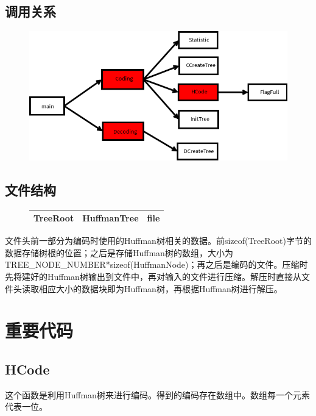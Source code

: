 \documentclass[a4paper]{ctexart}
\begin{document}
\subsection{调用关系}
\begin{figure}[H]
\centering
\includegraphics[width=15cm]{function_relation}
\end{figure}

\subsection{文件结构}
\begin{figure}[H]
\begin{tabular}{|p{1.5cm}<{\centering}|p{2cm}<{\centering}|p{13cm}<{\centering}|}
	\hline
	TreeRoot & HuffmanTree & file \\
	\hline
\end{tabular}
\end{figure}
文件头前一部分为编码时使用的Huffman树相关的数据。前sizeof(TreeRoot)字节的数据存储树根的位置；之后是存储Huffman树的数组，大小为TREE\_NODE\_NUMBER*sizeof(HuffmanNode)；再之后是编码的文件。压缩时先将建好的Huffman树输出到文件中，再对输入的文件进行压缩。解压时直接从文件头读取相应大小的数据块即为Huffman树，再根据Huffman树进行解压。

\section{重要代码}

\subsection{HCode}
这个函数是利用Huffman树来进行编码。得到的编码存在数组中。数组每一个元素代表一位。
\end{document}
